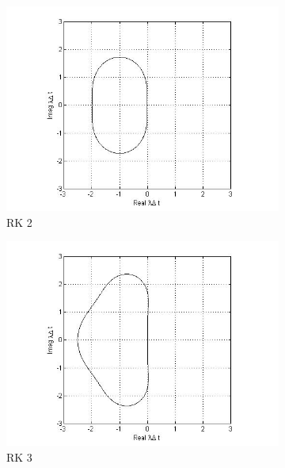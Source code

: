 \documentclass[a4paper,12pt]{report}
\begin{document}
\begin{figure}[h!]  
	\centering
	\begin{subfigure}[b]{0.4\textwidth}
		\includegraphics[width=\textwidth]{rk2.jpg}
                \caption{RK 2}
	\end{subfigure}
	\begin{subfigure}[b]{0.4\textwidth}
		\includegraphics[width=\textwidth]{rk3.jpg}
                \caption{RK 3}
	\end{subfigure}
	\begin{subfigure}[b]{0.4\textwidth}

\end{subfigure}
\end{figure}
\end{document}

